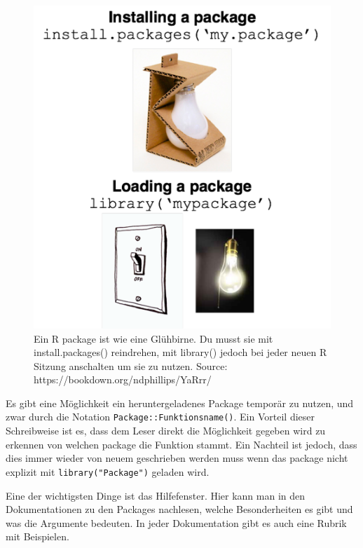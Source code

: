\documentclass[
]{article}
\begin{document}
\begin{figure}

{\centering \includegraphics[width=1\linewidth]{images/011} 

}

\caption{Ein R package ist wie eine Glühbirne. Du musst sie mit install.packages() reindrehen, mit library() jedoch bei jeder neuen R Sitzung anschalten um sie zu nutzen. Source: https://bookdown.org/ndphillips/YaRrr/}\label{fig:unnamed-chunk-17}
\end{figure}

Es gibt eine Möglichkeit ein heruntergeladenes Package temporär zu nutzen, und zwar durch die Notation \texttt{Package::Funktionsname()}. Ein Vorteil dieser Schreibweise ist es, dass dem Leser direkt die Möglichkeit gegeben wird zu erkennen von welchen package die Funktion stammt. Ein Nachteil ist jedoch, dass dies immer wieder von neuem geschrieben werden muss wenn das package nicht explizit mit \texttt{library("Package")} geladen wird.

Eine der wichtigsten Dinge ist das Hilfefenster. Hier kann man in den Dokumentationen zu den Packages nachlesen, welche Besonderheiten es gibt und was die Argumente bedeuten. In jeder Dokumentation gibt es auch eine Rubrik mit Beispielen.
\end{document}
